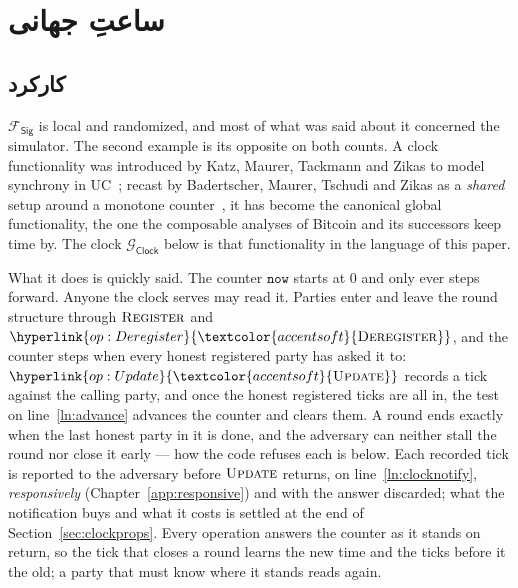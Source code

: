 \documentclass[10pt,oneside,openany]{book}
\newcommand{\op}[1]{\textnormal{\textsc{#1}}}
\newcommand{\opl}[1]{\hyperlink{op:#1}{\textcolor{accentsoft}{\op{#1}}}}
\newcommand{\Fsig}{\mathcal{F}_{\mathsf{Sig}}}
\newcommand{\Gclock}{\mathcal{G}_{\mathsf{Clock}}}
\newcommand{\V}[1]{\mathtt{#1}}
\theoremstyle{accentdef}
\theoremstyle{accentplain}
\begin{document}
\chapter{ساعتِ جهانی}\label{sec:gclock}

\section{کارکرد}\label{sec:gclockfunc}

$\Fsig$ is local and randomized, and most of what was said about it concerned the simulator. The
second example is its opposite on both counts. A clock functionality was introduced by Katz,
Maurer, Tackmann and Zikas to model synchrony in UC~\cite{KMTZ13}; recast by Badertscher, Maurer,
Tschudi and Zikas as a \emph{shared} setup around a monotone counter~\cite{BMTZ17}, it has become
the canonical global functionality, the one the composable analyses of Bitcoin and its successors
keep time by. The clock $\Gclock$ below is that functionality in the language of this paper.

What it does is quickly said. The counter $\V{now}$ starts at $0$ and only ever steps forward.
Anyone the clock serves may read it. Parties enter and leave the round structure through
$\op{Register}$ and $\opl{Deregister}$, and the counter steps when every honest registered party
has asked it to: $\opl{Update}$ records a tick against the calling party, and once the honest
registered ticks are all in, the test on line~\ref{ln:advance} advances the counter and clears
them. A round ends exactly when the last honest party in it is done, and the adversary can
neither stall the round nor close it early --- how the code refuses each is below. Each recorded
tick is reported to the adversary before $\op{Update}$ returns, on line~\ref{ln:clocknotify},
\emph{responsively} (Chapter~\ref{app:responsive}) and with the answer discarded; what the
notification buys and what it costs is settled at the end of Section~\ref{sec:clockprops}.
Every operation answers the counter as it stands on return, so the tick that closes a round
learns the new time and the ticks before it the old; a party that must know where it stands
reads again.
\end{document}
